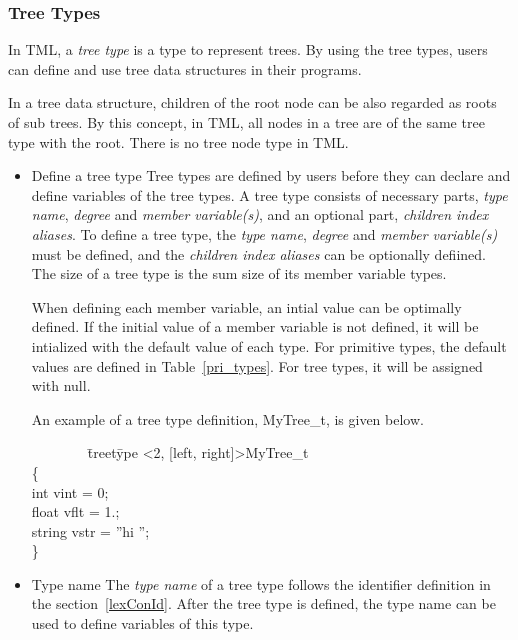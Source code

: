 \documentclass[12pt,psfig,a4]{article}
\begin{document}
\subsubsection {Tree Types}
In TML, a \textit{tree type} is a type to represent trees. By using the tree types, users can define and use tree data structures in their programs.

In a tree data structure, children of the root node can be also regarded as roots of sub trees. By this concept, in TML, all nodes in a tree are of the same tree type with the root. There is no tree node type in TML.

\begin{itemize}
\item Define a tree type
\label{defTreetype}
Tree types are defined by users before they can declare and define variables of the tree types. A tree type consists of necessary parts, \textit{type name}, \textit{degree} and \textit{member variable(s)}, and an optional part, \textit{children index aliases}. To define a tree type, the \textit{type name}, \textit{degree} and \textit{member variable(s)} must be defined, and the \textit{children index aliases} can be optionally defiined. The size of a tree type is the sum size of its member variable types.

When defining each member variable, an intial value can be optimally defined. If the initial value of a member variable is not defined, it will be intialized with the default value of each type. For primitive types, the default values are defined in Table~\ref{pri_types}. For tree types, it will be assigned with null.

An example of a tree type definition, MyTree\_t, is given below.

\begin{code}
\begin{tabbing}
~~~~~~~~\= treet\=ype \textless2, [left, right]\textgreater MyTree\_t \\
\> \{ \\
\> \>int vint = 0;\\
\> \>float vflt = 1.;\\
\> \>string vstr = ''hi '';\\
\> \}
\end{tabbing}
\end{code}

\item Type name
The \textit{type name} of a tree type follows the identifier definition in the section~\ref{lexConId}. After the tree type is defined, the type name can be used to define variables of this type.


\end{itemize}
\end{document}
